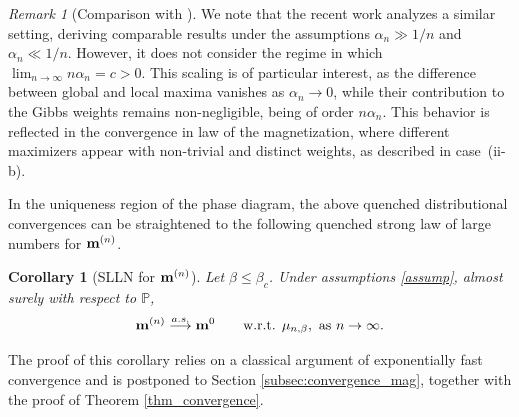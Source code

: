 \documentclass[11pt,oneside]{amsart}
\numberwithin{equation}{section}  %
\theoremstyle{plain}
\newtheorem{corollary}[theorem]{Corollary}
\theoremstyle{remark}
\newtheorem{remark}{Remark}
\def \bm {{\bf m}}
\begin{document}
\begin{remark}[Comparison with \cite{LL26}]
We note that the recent work \cite{LL26} analyzes a similar setting, 
deriving comparable results under the assumptions $\alpha_n \gg 1/n$ and $\alpha_n \ll 1/n$.
However, it does not consider the regime in which 
$\displaystyle{\lim_{n \to \infty}} n\alpha_n = c > 0$. 
This scaling is of particular interest, as the difference between global 
and local maxima vanishes as $\alpha_n \to 0$, while their contribution to the Gibbs weights remains non-negligible, 
being of order $n\alpha_n$. 
This behavior is reflected in the convergence in law of the magnetization, 
where different maximizers appear with non-trivial and distinct weights, as described in case~(ii-b).
\end{remark}



In the uniqueness region of the phase diagram, the above quenched distributional convergences 
can be straightened to the following quenched strong law of large numbers for $\bm^{(n)}$.  
\begin{corollary}[SLLN for $\bm^{(n)}$]
\label{cor}
Let $\beta\le \beta_c$. Under assumptions \eqref{assump}, almost surely with respect to $\mathbb{P}$,
\begin{equation*}
\bm^{(n)} \overset{a.s.}{\longrightarrow} \bm^0 \qquad \mbox{w.r.t. } \mu_{n,\beta}, \mbox{ as }n\to\infty.
\end{equation*}
\end{corollary}
The proof of this corollary relies on a classical argument of exponentially fast convergence and is postponed to Section \ref{subsec:convergence_mag}, together with the proof of Theorem \ref{thm_convergence}.
\\
\end{document}
